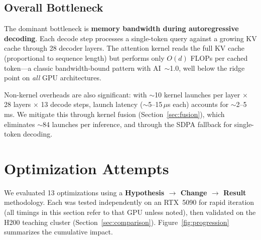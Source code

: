 \documentclass{article}
\begin{document}
\subsection{Overall Bottleneck}

The dominant bottleneck is \textbf{memory bandwidth during autoregressive decoding}.  Each decode step processes a single-token query against a growing KV cache through 28 decoder layers.  The attention kernel reads the full KV cache (proportional to sequence length) but performs only $O(d)$ FLOPs per cached token---a classic bandwidth-bound pattern with AI~$\sim$1.0, well below the ridge point on \emph{all} GPU architectures.

Non-kernel overheads are also significant: with $\sim$10 kernel launches per layer $\times$ 28 layers $\times$ 13 decode steps, launch latency ($\sim$5--15\,$\mu$s each) accounts for $\sim$2--5\,ms.  We mitigate this through kernel fusion (Section~\ref{sec:fusion}), which eliminates $\sim$84 launches per inference, and through the SDPA fallback for single-token decoding.


\section{Optimization Attempts}\label{sec:optimization}

We evaluated 13 optimizations using a \textbf{Hypothesis $\to$ Change $\to$ Result} methodology.  Each was tested independently on an RTX~5090 for rapid iteration (all timings in this section refer to that GPU unless noted), then validated on the H200 teaching cluster (Section~\ref{sec:comparison}).
Figure~\ref{fig:progression} summarizes the cumulative impact.
\end{document}
